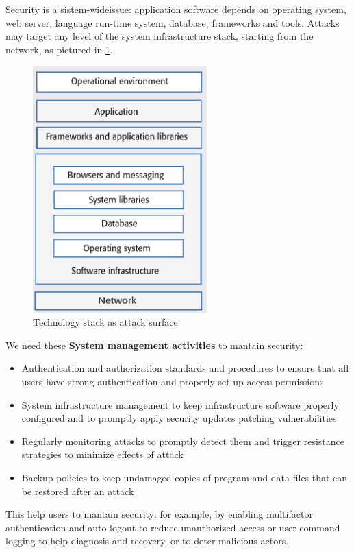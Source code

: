 \documentclass[10pt,a4paper]{report}
\begin{document}
Security is a sistem-wideissue: application software depends on operating system, web server, language run-time system, database, frameworks and tools.
Attacks may target any level of the system infrastructure stack, starting from the network, as pictured in \ref{image84}.
\begin{figure}[h]
	\centering
	\includegraphics[width=0.6\textwidth]{image84}
	\caption{Technology stack as attack surface}
	\label{image84}
\end{figure} 
We need these \textbf{System management activities} to mantain security:
\begin{itemize}
	\item Authentication and authorization standards and procedures to ensure that all users have
	strong authentication and properly set up access permissions
	\item System infrastructure management to keep infrastructure software properly configured
	and to promptly apply security updates patching vulnerabilities
	\item Regularly monitoring attacks to promptly detect them and trigger resistance strategies to
	minimize effects of attack
	\item Backup policies to keep undamaged copies of program and data files that can be restored
	after an attack
	
\end{itemize}
This help users to mantain security: for example, by enabling multifactor authentication and auto-logout to reduce unauthorized access or user command logging to help diagnosis and recovery, or to deter malicious actors.
\end{document}
